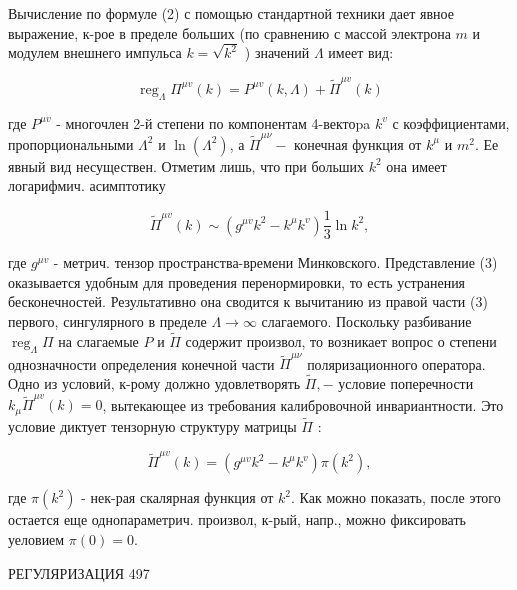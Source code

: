 \documentclass[10pt]{article}
\begin{document}
Вычисление по формуле (2) с помощью стандартной техники дает явное выражение, к-рое в пределе больших (по сравнению с массой электрона $m$ и модулем внешнего импульса $k=\sqrt{k^{2}}$ ) значений $\Lambda$ имеет вид:



\[

\operatorname{reg}_{\Lambda} \Pi^{\mu v}(k)=P^{\mu v}(k, \Lambda)+\tilde{\Pi}^{\mu v}(k)

\]



где $P^{\mu v}$ - многочлен 2-й степени по компонентам 4-вектоpa $k^{v}$ с коэффициентами, пропорциональными $\Lambda^{2}$ и $\ln \left(\Lambda^{2}\right)$, а $\tilde{\Pi}^{\mu \nu}-$ конечная функция от $k^{\mu}$ и $m^{2}$. Ее явный вид несуществен. Отметим лишь, что при больших $k^{2}$ она имеет логарифмич. асимптотику



\[

\tilde{\Pi}^{\mu v}(k) \sim\left(g^{\mu v} k^{2}-k^{\mu} k^{v}\right) \frac{1}{3} \ln k^{2},

\]



где $g^{\mu v}$ - метрич. тензор пространства-времени Минковского. Представление (3) оказывается удобным для проведения перенормировки, то есть устранения бесконечностей. Результативно она сводится к вычитанию из правой части (3) первого, сингулярного в пределе $\Lambda \rightarrow \infty$ слагаемого. Поскольку разбивание $\operatorname{reg}_{\Lambda} \Pi$ на слагаемые $P$ и $\tilde{\Pi}$ содержит произвол, то возникает вопрос о степени однозначности определения конечной части $\tilde{\Pi}^{\mu \nu}$ поляризационного оператора. Одно из условий, к-рому должно удовлетворять $\tilde{\Pi},-$ условие поперечности $k_{\mu} \tilde{\Pi}^{\mu v}(k)=0$, вытекающее из требования калибровочной инвариантности. Это условие диктует тензорную структуру матрицы $\tilde{\Pi}$ :



\[

\tilde{\Pi}^{\mu v}(k)=\left(g^{\mu v} k^{2}-k^{\mu} k^{v}\right) \pi\left(k^{2}\right),

\]



где $\pi\left(k^{2}\right)$ - нек-рая скалярная функция от $k^{2}$. Как можно показать, после этого остается еще однопараметрич. произвол, к-рый, напр., можно фиксировать уеловием $\pi(0)=0$.



РЕГУЛЯРИЗАЦИЯ 497
\end{document}
